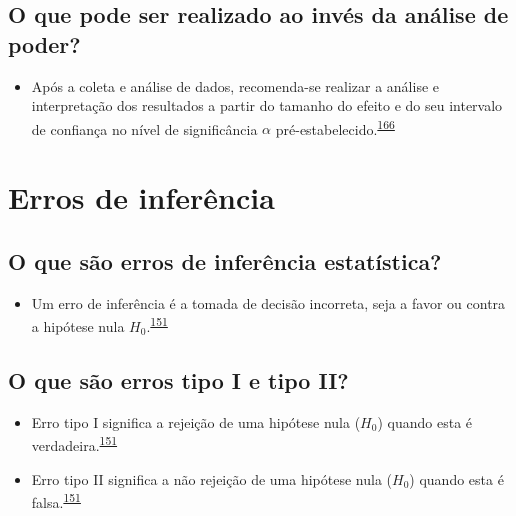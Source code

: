 \documentclass[
  a4paper,
]{book}
\providecommand{\tightlist}{%
  \setlength{\itemsep}{0pt}\setlength{\parskip}{0pt}}
\begin{document}
\hypertarget{o-que-pode-ser-realizado-ao-invuxe9s-da-anuxe1lise-de-poder}{%
\subsection{O que pode ser realizado ao invés da análise de poder?}\label{o-que-pode-ser-realizado-ao-invuxe9s-da-anuxe1lise-de-poder}}

\begin{itemize}
\tightlist
\item
  Após a coleta e análise de dados, recomenda-se realizar a análise e interpretação dos resultados a partir do tamanho do efeito e do seu intervalo de confiança no nível de significância \(\alpha\) pré-estabelecido.\textsuperscript{\protect\hyperlink{ref-heckman2022}{166}}
\end{itemize}

\hypertarget{erros-de-inferuxeancia}{%
\section{Erros de inferência}\label{erros-de-inferuxeancia}}

\hypertarget{o-que-suxe3o-erros-de-inferuxeancia-estatuxedstica}{%
\subsection{O que são erros de inferência estatística?}\label{o-que-suxe3o-erros-de-inferuxeancia-estatuxedstica}}

\begin{itemize}
\tightlist
\item
  Um erro de inferência é a tomada de decisão incorreta, seja a favor ou contra a hipótese nula \(H_{0}\).\textsuperscript{\protect\hyperlink{ref-Curran-Everett2009}{151}}
\end{itemize}

\hypertarget{o-que-suxe3o-erros-tipo-i-e-tipo-ii}{%
\subsection{O que são erros tipo I e tipo II?}\label{o-que-suxe3o-erros-tipo-i-e-tipo-ii}}

\begin{itemize}
\item
  Erro tipo I significa a rejeição de uma hipótese nula (\(H_{0}\)) quando esta é verdadeira.\textsuperscript{\protect\hyperlink{ref-Curran-Everett2009}{151}}
\item
  Erro tipo II significa a não rejeição de uma hipótese nula (\(H_{0}\)) quando esta é falsa.\textsuperscript{\protect\hyperlink{ref-Curran-Everett2009}{151}}
\end{itemize}
\end{document}
